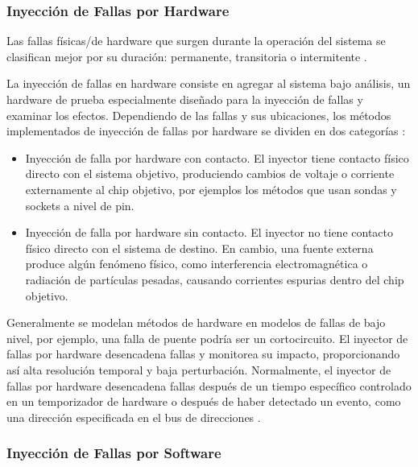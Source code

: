 \subsubsection{Inyección de Fallas por Hardware}
\par Las fallas físicas/de hardware que surgen durante la operación del sistema se clasifican mejor por su duración: permanente, transitoria o intermitente \cite{LIB05}.\\
\par La inyección de fallas en hardware consiste en agregar al sistema bajo análisis, un hardware de prueba especialmente diseñado para la inyección de fallas y examinar los efectos. Dependiendo de las fallas y sus ubicaciones, los métodos implementados de inyección de fallas por hardware se dividen en dos categorías \cite{LIB05}:
\begin{itemize}
    \item Inyección de falla por hardware con contacto. El inyector tiene contacto físico directo con el sistema objetivo, produciendo cambios de voltaje o corriente externamente al chip objetivo, por ejemplos los métodos que usan sondas y sockets a nivel de pin.
    \item Inyección de falla por hardware sin contacto. El inyector no tiene contacto físico directo con el sistema de destino. En cambio, una fuente externa produce algún fenómeno físico, como interferencia electromagnética o radiación de partículas pesadas, causando corrientes espurias dentro del chip objetivo.
\end{itemize}
\par Generalmente se modelan métodos de hardware en modelos de fallas de bajo nivel, por ejemplo, una falla de puente podría ser un cortocircuito. El inyector de fallas por hardware desencadena fallas y monitorea su impacto, proporcionando así alta resolución temporal y baja perturbación. Normalmente, el inyector de fallas por hardware desencadena fallas después de un tiempo específico controlado en un temporizador de hardware o después de haber detectado un evento, como una dirección especificada en el bus de direcciones \cite{LIB07}.\\

\subsubsection{Inyección de Fallas por Software}

